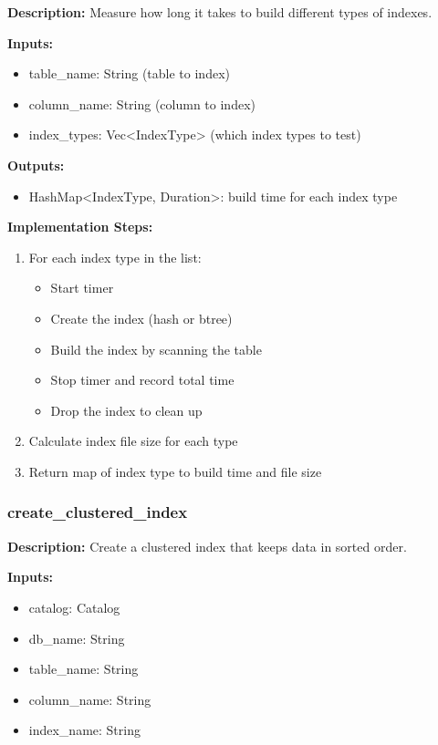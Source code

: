 \documentclass[11pt,a4paper]{article}
\begin{document}
\textbf{Description:} Measure how long it takes to build different types of indexes.

\textbf{Inputs:}
\begin{itemize}
\item table\_name: String (table to index)
\item column\_name: String (column to index)
\item index\_types: Vec<IndexType> (which index types to test)
\end{itemize}

\textbf{Outputs:}
\begin{itemize}
\item HashMap<IndexType, Duration>: build time for each index type
\end{itemize}

\textbf{Implementation Steps:}
\begin{enumerate}
\item For each index type in the list:
    \begin{itemize}
    \item Start timer
    \item Create the index (hash or btree)
    \item Build the index by scanning the table
    \item Stop timer and record total time
    \item Drop the index to clean up
    \end{itemize}
\item Calculate index file size for each type
\item Return map of index type to build time and file size
\end{enumerate}

\subsubsection{create\_clustered\_index}

\textbf{Description:} Create a clustered index that keeps data in sorted order.

\textbf{Inputs:}
\begin{itemize}
\item catalog: Catalog
\item db\_name: String
\item table\_name: String
\item column\_name: String
\item index\_name: String
\end{itemize}
\end{document}
